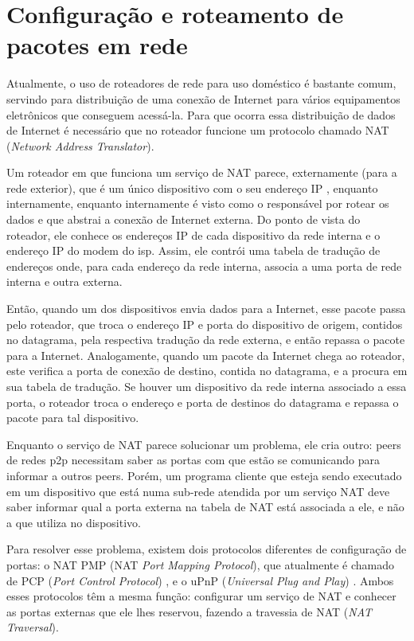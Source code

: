 
\section{Configuração e roteamento de pacotes em rede}

Atualmente, o uso de roteadores de rede para uso doméstico é bastante comum, servindo
para distribuição de uma conexão de Internet para vários equipamentos eletrônicos que
conseguem acessá-la. Para que ocorra essa distribuição de dados de Internet é
necessário que no roteador funcione um protocolo chamado NAT
(\emph{Network Address Translator}).

Um roteador em que funciona um serviço de NAT parece, externamente (para a rede
exterior), que é um único dispositivo com o seu endereço IP \cite{book:kurose}, enquanto
internamente, enquanto internamente é visto como o responsável por rotear os dados e
que abstrai a conexão de Internet externa. Do ponto de vista do roteador, ele conhece os
endereços IP de cada dispositivo da rede interna e o endereço IP do modem do \gls{isp}.
Assim, ele contrói uma tabela de tradução de endereços onde, para cada endereço da rede
interna, associa a uma porta de rede interna e outra externa.

Então, quando um dos dispositivos envia dados para a Internet, esse pacote passa pelo
roteador, que troca o endereço IP e porta do dispositivo de origem, contidos no
datagrama, pela respectiva tradução da rede externa, e então repassa o pacote para a
Internet. Analogamente, quando um pacote da Internet chega ao roteador, este verifica a
porta de conexão de destino, contida no datagrama, e a procura em sua tabela de
tradução. Se houver um dispositivo da rede interna associado a essa porta, o roteador
troca o endereço e porta de destinos do datagrama e repassa o pacote para tal
dispositivo.

Enquanto o serviço de NAT parece solucionar um problema, ele cria outro: \glspl*{peer}
de redes \gls*{p2p} necessitam saber as portas com que estão se comunicando para
informar a outros \glspl*{peer}. Porém, um programa cliente que esteja sendo executado
em um dispositivo que está numa sub-rede atendida por um serviço NAT deve saber informar
qual a porta externa na tabela de NAT está associada a ele, e não a que utiliza no
dispositivo.

Para resolver esse problema, existem dois protocolos diferentes de configuração de
portas: o NAT PMP (NAT \emph{Port Mapping Protocol}), que atualmente é chamado de PCP
(\emph{Port Control Protocol}) \cite{site:rfcpcp}, e o uPnP
(\emph{Universal Plug and Play}) \cite{site:rfcupnp}. Ambos esses protocolos têm a mesma
função: configurar um serviço de NAT e conhecer as portas externas que ele lhes
reservou, fazendo a travessia de NAT (\emph{NAT Traversal}).

